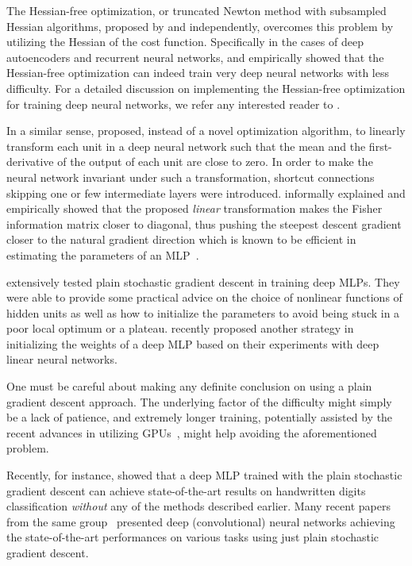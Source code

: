 \documentclass{now}
\begin{document}
The Hessian-free optimization, or truncated Newton method with subsampled
Hessian algorithms, proposed by \citet{Martens2010} and \citet{Byrd2011}
independently, overcomes this problem by utilizing the Hessian of the cost
function. Specifically in the cases of deep autoencoders and recurrent neural
networks, \citet{Martens2010} and \citet{Sutskever2011} empirically showed that
the Hessian-free optimization can indeed train very deep neural networks with
less difficulty. For a detailed discussion on implementing the Hessian-free
optimization for training deep neural networks, we refer any interested reader
to \citep{Martens2012}.

In a similar sense, \citet{Raiko2012} proposed, instead of a novel optimization
algorithm, to linearly transform each unit in a deep neural network such that
the mean and the first-derivative of the output of each unit are close to zero.
In order to make the neural network invariant under such a transformation,
shortcut connections skipping one or few intermediate layers were introduced.
\citet{Raiko2012} informally explained and empirically showed that the proposed
\textit{linear} transformation makes the Fisher information matrix closer to
diagonal, thus pushing the steepest descent gradient closer to the natural
gradient direction which is known to be efficient in estimating the parameters
of an MLP~\citep{Amari1998,Pascanu2014}.

\citet{Glorot2010} extensively tested plain stochastic gradient descent in
training deep MLPs. They were able to provide some practical advice on the
choice of nonlinear functions of hidden units as well as how to initialize the
parameters to avoid being stuck in a poor local optimum or a plateau.
\citet{Saxe2014} recently proposed another strategy in initializing the weights
of a deep MLP based on their experiments with deep linear neural networks.

One must be careful about making any definite conclusion on using a plain
gradient descent approach. The underlying factor of the difficulty might simply
be a lack of patience, and extremely longer training, potentially assisted by
the recent advances in utilizing GPUs~\citep[see, e.g.,][]{Raina2009}, might
help avoiding the aforementioned problem.

Recently, for instance, \citet{Ciresan2012g} showed that a deep MLP trained with
the plain stochastic gradient descent can achieve state-of-the-art results on
handwritten digits classification \textit{without} any of the methods described
earlier. Many recent papers from the same group~\citep[see,
e.g.][]{Ciresan2012c,Ciresan2012b,Ciresan2012f} presented deep (convolutional)
neural networks achieving the state-of-the-art performances on various tasks
using just plain stochastic gradient descent.
\end{document}
